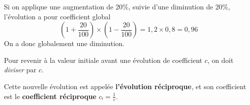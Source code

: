 \documentclass[
	classe=$2^{de}$
]{coursclass}
\begin{document}
\begin{exemple}
	Si on applique une augmentation de 20\%, suivie d'une diminution de 20\%, l'évolution a pour coefficient global
	$$ \left(1 + \frac{20}{100}\right) × \left(1 - \frac{20}{100}\right) = 1,2 × 0,8 = 0,96 $$
	On a donc globalement une diminution.
\end{exemple}

\begin{propriete}
	Pour revenir à la valeur initiale avant une évolution de coefficient $c$, on doit \textit{diviser} par $c$.

	Cette nouvelle évolution est appelée \textbf{l'évolution réciproque}, et son coefficient est le \textbf{coefficient réciproque} $cᵣ = \frac{1}{c}$.
\end{propriete}
\end{document}
